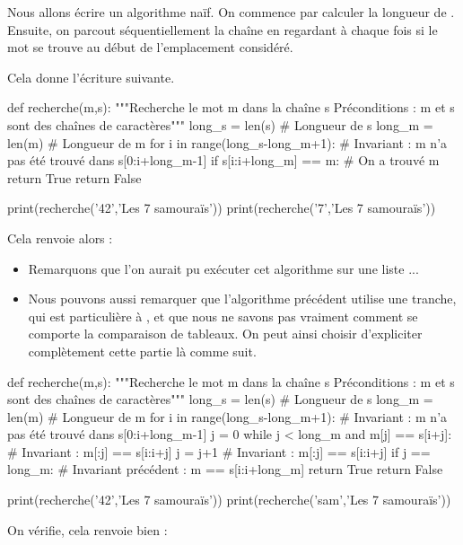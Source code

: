 Nous allons écrire un algorithme naïf. On commence par calculer la longueur de . 
Ensuite, on parcout séquentiellement la chaîne  en regardant à chaque fois si le mot se trouve au début de l'emplacement considéré.

Cela donne l'écriture suivante.
\begin{pyblock}
def recherche(m,s):
    """Recherche le mot m dans la chaîne s
       Préconditions : m et s sont des chaînes de caractères"""
    long_s = len(s) # Longueur de s
    long_m = len(m) # Longueur de m
    for i in range(long_s-long_m+1): 
        # Invariant : m n'a pas été trouvé dans s[0:i+long_m-1]
        if s[i:i+long_m] == m: # On a trouvé m
            return True
    return False

print(recherche('42','Les 7 samouraïs'))
print(recherche('7','Les 7 samouraïs'))
\end{pyblock}
Cela renvoie alors :
\begin{quote}
  \printpythontex[verb]
\end{quote}

\begin{rem}
\begin{itemize}
\item Remarquons que l'on aurait pu exécuter cet algorithme sur une liste \python ...

\item Nous pouvons aussi remarquer que l'algorithme précédent utilise une tranche, qui est particulière à \python, et que nous ne savons pas vraiment comment se comporte la comparaison de tableaux. 
On peut ainsi choisir d'expliciter complètement cette partie là comme suit.
\end{itemize}

\end{rem}
\begin{pyblock}
def recherche(m,s):
    """Recherche le mot m dans la chaîne s
       Préconditions : m et s sont des chaînes de caractères"""
    long_s = len(s) # Longueur de s
    long_m = len(m) # Longueur de m
    for i in range(long_s-long_m+1): 
        # Invariant : m n'a pas été trouvé dans s[0:i+long_m-1]
        j = 0
        while j < long_m and m[j] == s[i+j]:
            # Invariant : m[:j] == s[i:i+j]
            j = j+1
            # Invariant : m[:j] == s[i:i+j]
        if j == long_m:
            # Invariant précédent : m == s[i:i+long_m]
            return True
    return False

print(recherche('42','Les 7 samouraïs'))
print(recherche('sam','Les 7 samouraïs'))
\end{pyblock}
On vérifie, cela renvoie bien :
\begin{quote}
  \printpythontex[verb]
\end{quote}
